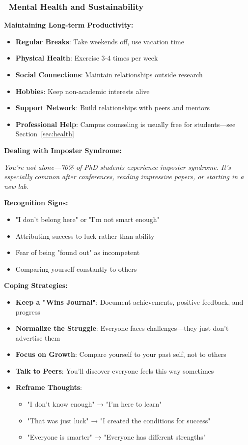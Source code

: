\documentclass[11pt,a4paper]{article}
\begin{document}
\subsubsection{\faHeart~Mental Health and Sustainability}

\textbf{Maintaining Long-term Productivity:}
\begin{itemize}
    \item \textbf{Regular Breaks}: Take weekends off, use vacation time
    \item \textbf{Physical Health}: Exercise 3-4 times per week
    \item \textbf{Social Connections}: Maintain relationships outside research
    \item \textbf{Hobbies}: Keep non-academic interests alive
    \item \textbf{Support Network}: Build relationships with peers and mentors
    \item \textbf{Professional Help}: Campus counseling is usually free for students---see Section~\ref{sec:health}
\end{itemize}

\textbf{Dealing with Imposter Syndrome:}

\textit{You're not alone—70\% of PhD students experience imposter syndrome. It's especially common after conferences, reading impressive papers, or starting in a new lab.}

\textbf{Recognition Signs:}
\begin{itemize}
    \item "I don't belong here" or "I'm not smart enough"
    \item Attributing success to luck rather than ability
    \item Fear of being "found out" as incompetent
    \item Comparing yourself constantly to others
\end{itemize}

\textbf{Coping Strategies:}
\begin{itemize}
    \item \textbf{Keep a "Wins Journal"}: Document achievements, positive feedback, and progress
    \item \textbf{Normalize the Struggle}: Everyone faces challenges—they just don't advertise them
    \item \textbf{Focus on Growth}: Compare yourself to your past self, not to others
    \item \textbf{Talk to Peers}: You'll discover everyone feels this way sometimes
    \item \textbf{Reframe Thoughts}: 
    \begin{itemize}
        \item "I don't know enough" → "I'm here to learn"
        \item "That was just luck" → "I created the conditions for success"
        \item "Everyone is smarter" → "Everyone has different strengths"
    \end{itemize}
\end{itemize}
\end{document}
